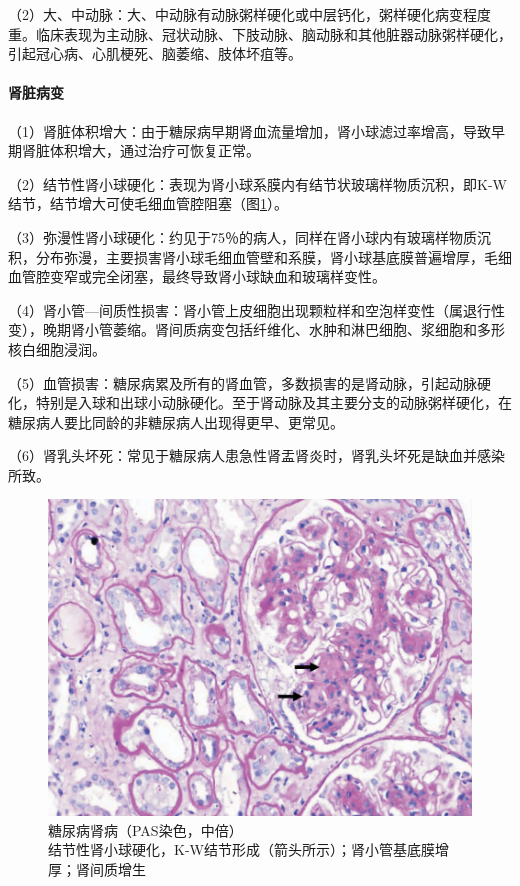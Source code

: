 （2）大、中动脉：大、中动脉有动脉粥样硬化或中层钙化，粥样硬化病变程度重。临床表现为主动脉、冠状动脉、下肢动脉、脑动脉和其他脏器动脉粥样硬化，引起冠心病、心肌梗死、脑萎缩、肢体坏疽等。

\paragraph{肾脏病变}
（1）肾脏体积增大：由于糖尿病早期肾血流量增加，肾小球滤过率增高，导致早期肾脏体积增大，通过治疗可恢复正常。

（2）结节性肾小球硬化：表现为肾小球系膜内有结节状玻璃样物质沉积，即K-W结节，结节增大可使毛细血管腔阻塞（图\ref{fig12-8}）。

（3）弥漫性肾小球硬化：约见于75％的病人，同样在肾小球内有玻璃样物质沉积，分布弥漫，主要损害肾小球毛细血管壁和系膜，肾小球基底膜普遍增厚，毛细血管腔变窄或完全闭塞，最终导致肾小球缺血和玻璃样变性。

（4）肾小管---间质性损害：肾小管上皮细胞出现颗粒样和空泡样变性（属退行性变），晚期肾小管萎缩。肾间质病变包括纤维化、水肿和淋巴细胞、浆细胞和多形核白细胞浸润。

（5）血管损害：糖尿病累及所有的肾血管，多数损害的是肾动脉，引起动脉硬化，特别是入球和出球小动脉硬化。至于肾动脉及其主要分支的动脉粥样硬化，在糖尿病人要比同龄的非糖尿病人出现得更早、更常见。

（6）肾乳头坏死：常见于糖尿病人患急性肾盂肾炎时，肾乳头坏死是缺血并感染所致。

\begin{figure}[!htbp]
 \centering
 \includegraphics{./images/Image00216.jpg}
 \captionsetup{justification=centering}
 \caption{糖尿病肾病（PAS染色，中倍）\\ {\small 结节性肾小球硬化，K-W结节形成（箭头所示）；肾小管基底膜增厚；肾间质增生}}
\label{fig12-8}
  \end{figure}

